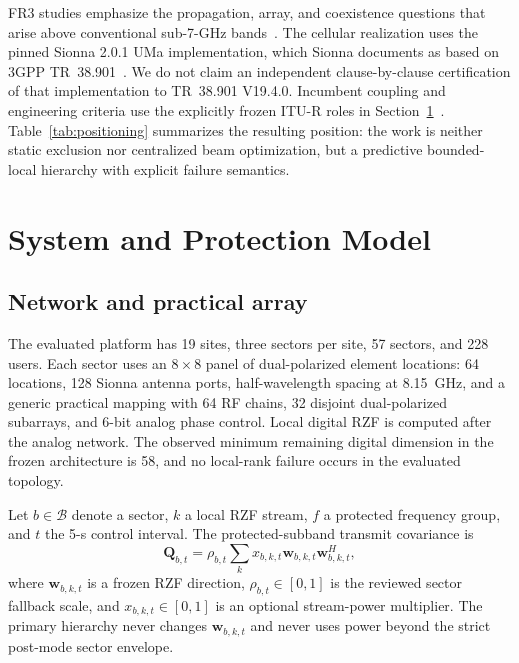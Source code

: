 \documentclass[journal]{IEEEtran}
\newcommand{\B}{\mathcal{B}}
\begin{document}
FR3 studies emphasize the propagation, array, and coexistence questions that arise above conventional sub-7-GHz bands~\cite{kang2024upper,chamberlain2024sharing}. The cellular realization uses the pinned Sionna 2.0.1 UMa implementation, which Sionna documents as based on 3GPP TR~38.901~\cite{3gpp38901,hoydis2022sionna,sionna201docs}. We do not claim an independent clause-by-clause certification of that implementation to TR~38.901 V19.4.0. Incumbent coupling and engineering criteria use the explicitly frozen ITU-R roles in Section~\ref{sec:model}~\cite{iturp452,itursa1027,itursa509,iturf758}. Table~\ref{tab:positioning} summarizes the resulting position: the work is neither static exclusion nor centralized beam optimization, but a predictive bounded-local hierarchy with explicit failure semantics.



\section{System and Protection Model}
\label{sec:model}
\subsection{Network and practical array}
The evaluated platform has 19 sites, three sectors per site, 57 sectors, and 228 users. Each sector uses an $8\times8$ panel of dual-polarized element locations: 64 locations, 128 Sionna antenna ports, half-wavelength spacing at 8.15~GHz, and a generic practical mapping with 64 RF chains, 32 disjoint dual-polarized subarrays, and 6-bit analog phase control. Local digital RZF is computed after the analog network. The observed minimum remaining digital dimension in the frozen architecture is 58, and no local-rank failure occurs in the evaluated topology.

Let $b\in\B$ denote a sector, $k$ a local RZF stream, $f$ a protected frequency group, and $t$ the 5-s control interval. The protected-subband transmit covariance is
\begin{equation}
 \bm Q_{b,t}=\rho_{b,t}\sum_{k}x_{b,k,t}
 \bm w_{b,k,t}\bm w_{b,k,t}^{H},
 \label{eq:covariance}
\end{equation}
where $\bm w_{b,k,t}$ is a frozen RZF direction, $\rho_{b,t}\in[0,1]$ is the reviewed sector fallback scale, and $x_{b,k,t}\in[0,1]$ is an optional stream-power multiplier. The primary hierarchy never changes $\bm w_{b,k,t}$ and never uses power beyond the strict post-mode sector envelope.
\end{document}
